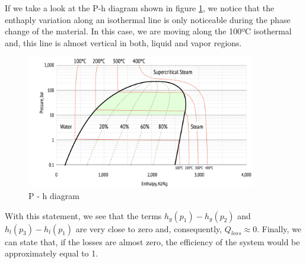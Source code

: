 \documentclass{article}
\begin{document}
If we take a look at the P-h diagram shown in figure \ref{fig:PH}, we notice that the enthaply variation along an isothermal line is only noticeable during the phase change of the material. In this case, we are moving along the 100ºC isothermal and, this line is almost vertical in both, liquid and vapor regions. 
\begin{figure}[htb]
\centering
    \label{fig:PH}
    \includegraphics[width=10cm ]{diagramPH.png}
    \caption{P - h diagram}
\end{figure}

With this statement, we see that the terms $h_g(p_1)-h_g(p_2)$ and  $h_l(p_3)-h_l(p_1)$ are very close to zero and, consequently, $Q_{loss}\approx 0$. Finally, we can state that, if the losses are almost zero, the efficiency of the system would be approximately equal to 1.
\end{document}
